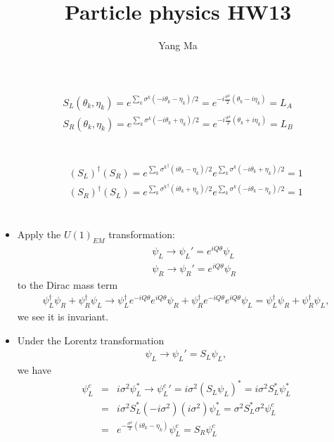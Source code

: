 \documentclass[11pt]{article}
\begin{document}
\title{Particle physics HW13}
\author{Yang Ma}

\maketitle

\section{ }
\begin{eqnarray}
    S_L(\theta_k,\eta_k)
  = e^{\sum_k \sigma^k (-i\theta_k -\eta_k)/2} = e^{-i\frac{\sigma^k}{2}(\theta_k-i\eta_k)} =L_A \\ 
  S_R(\theta_k,\eta_k)
  = e^{\sum_k \sigma^k (-i\theta_k +\eta_k)/2} =e^{-i\frac{\sigma^k}{2}(\theta_k+i\eta_k)} =L_B
\end{eqnarray}

\section{ }
\begin{eqnarray}
    &&(S_L)^\dagger (S_R) = e^{\sum_k {\sigma^k}^\dagger (i\theta_k -\eta_k)/2} e^{\sum_k \sigma^k (-i\theta_k +\eta_k)/2} = 1 \\
    &&(S_R)^\dagger (S_L) = e^{\sum_k {\sigma^k}^\dagger (i\theta_k +\eta_k)/2}e^{\sum_k \sigma^k (-i\theta_k -\eta_k)/2}=1
\end{eqnarray}

\section{ }
\begin{itemize}
    \item  Apply the $U(1)_{EM}$ transformation:
    \begin{eqnarray}
    &&\psi_L \to \psi_L' = e^{iQ\theta} \psi_L   \\
    &&\psi_R \to  \psi_R' = e^{iQ\theta} \psi_R 
    \end{eqnarray}
    to the Dirac mass term 
    \begin{eqnarray}
        \psi_L^\dagger \psi_R + \psi_R^\dagger \psi_L \to \psi_L^\dagger e^{-iQ\theta}e^{iQ\theta}\psi_R + \psi_R^\dagger e^{-iQ\theta}e^{iQ\theta} \psi_L =  \psi_L^\dagger \psi_R + \psi_R^\dagger \psi_L,
    \end{eqnarray}
    we see it is invariant.
    \item Under the Lorentz transformation
    \begin{eqnarray}
        \psi_L   \to \psi_L'   = S_L \psi_L ,
    \end{eqnarray}
    we have 
    \begin{eqnarray}
        \psi_L^c &=& i \sigma^2 \psi^*_L \to {\psi_L^c}' = i \sigma^2  (S_L \psi_L)^* = i \sigma^2  S_L^* \psi_L^* \\
        &=&i \sigma^2  S_L^* (-i \sigma^2)(i \sigma^2)\psi_L^* = \sigma^2 S_L^*\sigma^2 \psi_L^c \\
        &=& e^{-\frac{\sigma^k}{2}(i\theta_k-\eta_k)}\psi_L^c= S_R \psi_L^c 
    \end{eqnarray}
\end{itemize}
\end{document}
